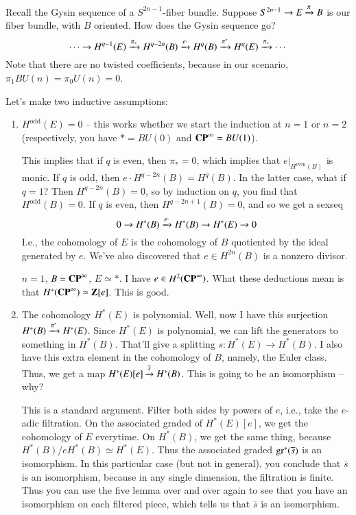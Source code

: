 Recall the Gysin sequence of a $S^{2n-1}$-fiber bundle.
Suppose $S^{2n-1}\to E\xrightarrow{{\pi}} B$ is our fiber bundle, with $B$ oriented.
How does the Gysin sequence go?
$$
\cdots\to H^{q-1}(E) \xrightarrow{{\pi_\ast}} H^{q-2n}(B) \xrightarrow{{e\cdot}} H^q(B) \xrightarrow{{\pi^\ast}} H^q(E) \xrightarrow{{\pi_\ast}} \cdots
$$
Note that there are no twisted coefficients, because in our scenario, $\pi_1 BU(n) = \pi_0 U(n) = 0$.

Let's make two inductive assumptions:
\begin{enumerate}
    \item $H^\mathrm{odd}(E) = 0$ -- this works whether we start the induction at $n=1$ or $n=2$ (respectively, you have $\ast = BU(0)$ and $\mathbf{CP}^\infty = BU(1)$).

	This implies that if $q$ is even, then $\pi_\ast = 0$, which implies that $e|_{H^\mathrm{even}(B)}$ is monic.
	If $q$ is odd, then $e\cdot H^{q-2n}(B) = H^q(B)$.
	In the latter case, what if $q=1$?
	Then $H^{q-2n}(B) = 0$, so by induction on $q$, you find that $H^\mathrm{odd}(B) = 0$.
	If $q$ is even, then $H^{q-2n+1}(B) = 0$, and so we get a sexseq
	$$
	0\to H^\ast(B) \xrightarrow{{e\cdot}} H^\ast(B) \to H^\ast(E) \to 0
	$$
	I.e., the cohomology of $E$ is the cohomology of $B$ quotiented by the ideal generated by $e$.
	We've also discovered that $e\in H^{2n}(B)$ is a nonzero divisor.

	\begin{example}
	    $n=1$, $B=\mathbf{CP}^\infty$, $E\simeq \ast$.
	    I have $e\in H^2(\mathbf{CP}^\infty)$.
	    What these deductions mean is that $H^\ast(\mathbf{CP}^\infty) \simeq \mathbf Z[e]$.
	    This is good.
	\end{example}
    \item The cohomology $H^\ast(E)$ is polynomial.
	Well, now I have this surjection $H^\ast(B) \xrightarrow{{\pi^\ast}} H^\ast(E)$.
	Since $H^\ast(E)$ is polynomial, we can lift the generators to something in $H^\ast(B)$.
	That'll give a splitting $s:H^\ast(E) \to H^\ast(B)$.
	I also have this extra element in the cohomology of $B$, namely, the Euler class.
	Thus, we get a map $H^\ast(E)[e] \xrightarrow{{\overline{s}}} H^\ast(B)$.
	This is going to be an isomorphism -- why?

	This is a standard argument.
	Filter both sides by powers of $e$, i.e., take the $e$-adic filtration.
	On the associated graded of $H^\ast(E)[e]$, we get the cohomology of $E$ everytime.
	On $H^\ast(B)$, we get the same thing, because $H^\ast(B)/eH^\ast(B) \simeq H^\ast(E)$.
	Thus the associated graded $\mathrm{gr}^\ast(\overline{s})$ is an isomorphism.
	In this particular case (but not in general), you conclude that $\overline{s}$ is an isomorphism, because in any single dimension, the filtration is finite.
	Thus you can use the five lemma over and over again to see that you have an isomorphism on each filtered piece, which tells us that $\overline{s}$ is an isomorphism.
\end{enumerate}
